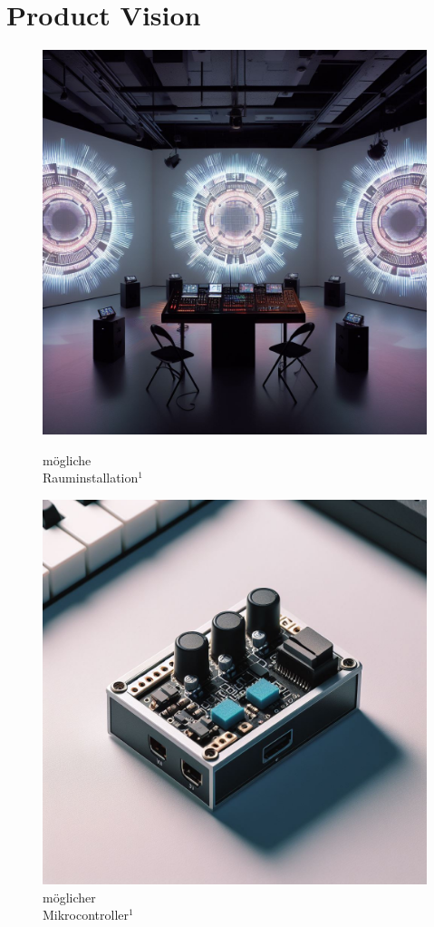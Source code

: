 \documentclass[12pt]{scrartcl}%
\theoremstyle{nonumberplain}
\begin{document}
\section{Product Vision}
\begin{figure}[h]
   \begin{minipage}[b]{.4\linewidth}
      \includegraphics[width=\linewidth]{vision1}
      \caption{mögliche\\Rauminstallation${}^{1}$}
   \end{minipage}
   \hspace{.1\linewidth}
   \begin{minipage}[b]{.4\linewidth}
      \includegraphics[width=\linewidth]{controller2}
      \caption{möglicher\\Mikrocontroller${}^{1}$}
   \end{minipage}
\end{figure}
\end{document}

